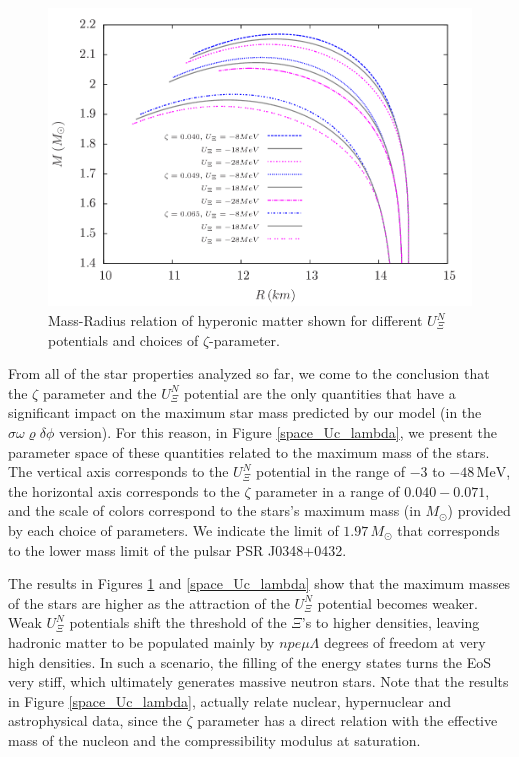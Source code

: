 \documentclass[twocolumn,showpacs,aps]{revtex4}
\begin{document}
 \begin{figure}
 \centering
 \vspace{1.0cm}
 \includegraphics[width=9.cm]{tov_paper_Ucascade_L97a32.png}
 \caption{\label{tov_Uc} Mass-Radius relation of hyperonic matter shown for different $U_{\Xi}^N$ potentials and choices of $\zeta$-parameter.}
 \end{figure}
 
From all of the star properties analyzed so far, we come to the conclusion that the $\zeta$ parameter and the $U_{\Xi}^N$ potential
are the only quantities that have a significant impact on the maximum star mass predicted by 
our model (in the $\sigma \omega \varrho \delta \phi$ version).
For this reason, in Figure \ref{space_Uc_lambda}, we present the parameter space of these quantities related to the 
maximum mass of the stars. The vertical axis corresponds to the $U_{\Xi}^N$ potential in the range of $-3$ to $-48\, \mathrm{MeV}$, 
the horizontal axis corresponds to the $\zeta$ parameter in a range of $0.040-0.071$, and the scale of colors correspond to the stars's maximum
mass (in $M_{\odot}$) provided by each choice of parameters. 
We indicate the limit of $1.97\,M_{\odot}$ that corresponds to the lower mass limit of the pulsar PSR J0348+0432.

The results in Figures \ref{tov_Uc} and \ref{space_Uc_lambda} show that the maximum masses of the stars are higher
as the attraction of the $U_{\Xi}^N$ potential becomes weaker. 
Weak $U_{\Xi}^N$ potentials shift the threshold of the $\Xi$'s to higher densities, leaving hadronic matter to be populated 
mainly by $n p e \mu \Lambda$ degrees of freedom at very high densities. 
In such a scenario, the filling of the energy states turns the EoS very stiff, which ultimately generates 
massive neutron stars.
Note that the results in Figure \ref{space_Uc_lambda}, actually relate nuclear, hypernuclear
and astrophysical data, since the $\zeta$ parameter has a direct relation with the effective mass of the nucleon 
and the compressibility modulus at saturation. 
 
\end{document}
